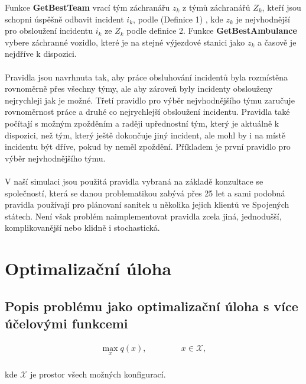 Funkce \textbf{GetBestTeam} vrací tým záchranářu $z_k$ z týmů záchranářů $Z_k$, kteří jsou schopni úspěšně odbavit incident $i_k$, podle (Definice 1)
, kde $z_k$ je nejvhodnější pro obsloužení incidentu $i_k$ ze $Z_k$ podle definice 2. %
Funkce \textbf{GetBestAmbulance} vybere záchranné vozidlo, které je na stejné výjezdové stanici jako $z_k$ a časově je nejdříve k dispozici.
\\
\\
Pravidla jsou navrhnuta tak, aby práce obsluhování incidentů byla rozmístěna rovnoměrně přes všechny týmy, ale aby zároveň byly incidenty obslouženy nejrychleji jak je možné.
Třetí pravidlo pro výběr nejvhodnějšího týmu zaručuje rovnoměrnost práce a druhé co nejrychlejší obsloužení incidentu.
Pravidla také počítají s možným zpožděním a raději upřednostní tým, který je aktuálně k dispozici, než tým, který ještě dokončuje jiný incident, ale mohl by i na místě incidentu
být dříve, pokud by neměl zpoždění. Příkladem je první pravidlo pro výběr nejvhodnějšího týmu.
\\
\\
V naší simulaci jsou použitá pravidla vybraná na základě konzultace se společností, která se danou problematikou zabývá přes 25 let a sami podobná pravidla používají pro plánovaní sanitek
u několika jejich klientů ve Spojených státech.
Není však problém naimplementovat pravidla zcela jiná, jednodušší, komplikovanější nebo klidně i stochastická.

\section{Optimalizační úloha}

\subsection{Popis problému jako optimalizační úloha s více účelovými funkcemi}

\begin{definice}
  \begin{align}
    \max_{x} q(x), \hspace{50pt} x \in \mathcal{X},
  \end{align}
  \\
  kde $\mathcal{X}$ je prostor všech možných konfigurací.
\end{definice}

